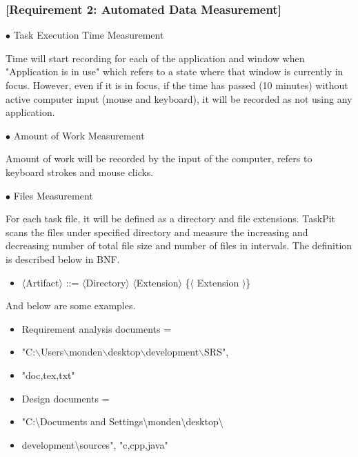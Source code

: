\documentclass [paper]{ieice}
\begin{document}
\subsubsection{[Requirement 2: Automated Data Measurement]}

\noindent $\bullet$ Task Execution Time Measurement \par
	Time will start recording for each of the application and window when "Application is in use" which refers to a state where that window is currently in focus. However, even if it is in focus, if the time has passed (10 minutes) without active computer input (mouse and keyboard), it will be recorded as not using any application. \newline

\noindent $\bullet$ Amount of Work Measurement \par
	Amount of work will be recorded by the input of the computer, refers to keyboard strokes and mouse clicks. \newline
	
\noindent $\bullet$ Files Measurement \par
	For each task file, it will be defined as a directory and file extensions. TaskPit scans the files under specified directory and measure the increasing  and decreasing number of total file size and number of files in intervals. The definition is described below in BNF.

\begin{itemize}
	\item[] $\langle$Artifact$\rangle$ ::= $\langle$Directory$\rangle$ $\langle$Extension$\rangle$ \{$\langle$ Extension $\rangle$\}
\end{itemize}

\noindent And below are some examples. \par
	
\begin{itemize}
	\item[] Requirement analysis documents = 
	\item[] "C:$\backslash$Users$\backslash$monden$\backslash$desktop$\backslash$development$\backslash$SRS", 
	\item[]"doc,tex,txt"
	\item[]Design documents = 
	\item[] "C:\textbackslash Documents and Settings\textbackslash monden\textbackslash desktop\textbackslash 
	\item[] development\textbackslash sources", "c,cpp,java" \newline
\end{itemize}
\end{document}
